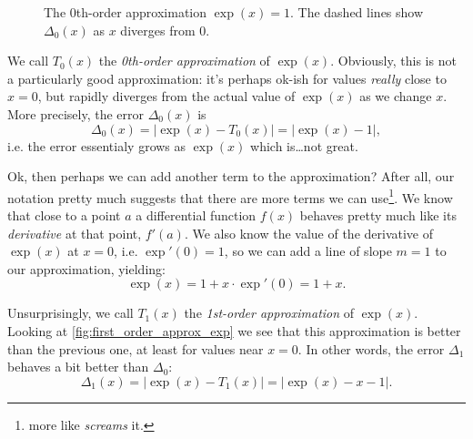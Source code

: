 \begin{figure}
  \centering
  \caption{The 0th-order approximation $\exp(x)=1$. The dashed lines show $\Delta_{0}(x)$ as $x$ diverges from $0$.}
  \label{fig:zero_order_approx_exp}
\end{figure}

We call $T_{0}(x)$ the \emph{0th-order approximation} of $\exp(x)$. Obviously, this is not a particularly good approximation: it's perhaps ok-ish for values \textit{really} close to $x=0$, but rapidly diverges from the actual value of $\exp(x)$ as we change $x$. More precisely, the error $\Delta_{0}(x)$ is
\begin{equation}
  \Delta_{0}(x) = \lvert \exp(x) - T_{0}(x) \rvert = \lvert \exp(x)-1 \rvert,
  \label{eq:exp_err_0}
\end{equation}
i.e. the error essentialy grows as $\exp(x)$ which is\dots not great.

Ok, then perhaps we can add another term to the approximation? After all, our notation pretty much suggests that there are more terms we can use\footnote{more like \textit{screams} it.}. We know that close to a point $a$ a differential function $f(x)$ behaves pretty much like its \textit{derivative} at that point, $f'(a)$. We also know the value of the derivative of $\exp(x)$ at $x=0$, i.e. $\exp'(0)=1$, so we can add a line of slope $m=1$ to our approximation, yielding:
\begin{equation}
  \exp(x) = 1 + x\cdot\exp'\left(0\right) = 1+x.
  \label{eq:first_order_approx_exp}
\end{equation}

Unsurprisingly, we call $T_{1}(x)$ the \emph{1st-order approximation} of $\exp(x)$. Looking at \autoref{fig:first_order_approx_exp} we see that this approximation is better than the previous one, at least for values near $x=0$. In other words, the error $\Delta_{1}$ behaves a bit better than $\Delta_{0}$:
\begin{equation}
  \Delta_{1}(x) = \lvert \exp(x) - T_{1}(x) \rvert = \lvert \exp(x)-x-1 \rvert.
  \label{eq:exp_err_1}
\end{equation}

